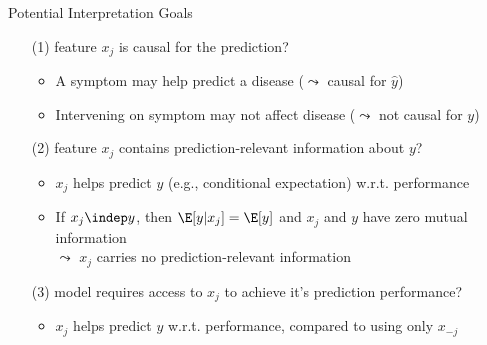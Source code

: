 \documentclass[11pt,compress,t,notes=noshow, aspectratio=169, xcolor=table]{beamer}
\begin{document}
\begin{frame}{Potential Interpretation Goals}
\begin{enumerate}
   \item[(1)] feature $x_j$ is causal for the prediction?
          \begin{itemize}
          \item A symptom may help predict a disease ($\leadsto$ causal for $\hat{y}$) %
          \item Intervening on symptom may not affect disease ($\leadsto$ not causal for $y$)
      \end{itemize}
    \item[(2)] feature $x_j$ contains prediction-relevant information about $y$?
    \begin{itemize}
      \item $x_j$ helps predict $y$ (e.g., conditional expectation) w.r.t. performance 
      \item If $x_j \indep y$, then $\E[y|x_j] = \E[y]$ and $x_j$ and $y$ have zero mutual information\\ %
      $\leadsto$ $x_j$ carries no prediction-relevant information
    \end{itemize}
    \item[(3)] model requires access to $x_j$ to achieve it's prediction performance?
    \begin{itemize}
      \item $x_{j}$ helps predict $y$ w.r.t. performance, compared to using only $x_{-j}$  %

\end{itemize}
\end{enumerate}
\end{frame}
\end{document}

